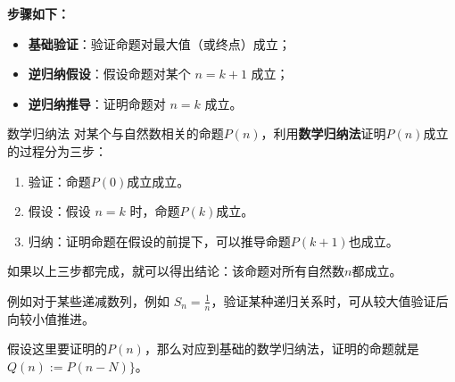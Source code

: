 \textbf{步骤如下：}
\begin{itemize}
    \item \textbf{基础验证}：验证命题对最大值（或终点）成立；
    \item \textbf{逆归纳假设}：假设命题对某个 $n = k+1$ 成立；
    \item \textbf{逆归纳推导}：证明命题对 $n = k$ 成立。
\end{itemize}

\begin{definition}{数学归纳法}
对某个与自然数相关的命题$P(n)$，利用\textbf{数学归纳法}证明$P(n)$成立的过程分为三步：
\begin{enumerate}
\item 验证：命题$P(0)$成立成立。
\item 假设：假设 $n = k$ 时，命题$P(k)$成立。
\item 归纳：证明命题在假设的前提下，可以推导命题$P(k+1)$也成立。
\end{enumerate}
如果以上三步都完成，就可以得出结论：该命题对所有自然数$n$都成立。
\end{definition}

例如对于某些递减数列，例如 $S_n = \frac{1}{n}$，验证某种递归关系时，可从较大值验证后向较小值推进。

假设这里要证明的$P(n)$，那么对应到基础的数学归纳法，证明的命题就是$Q(n):=P(n-N)\}$。